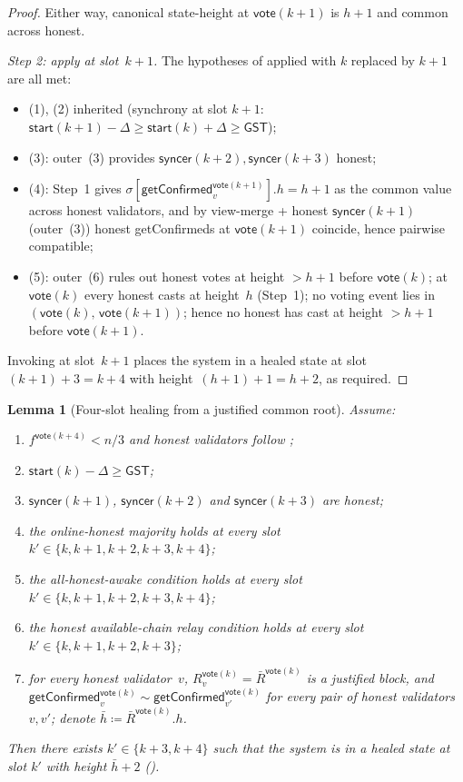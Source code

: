 \ifx\litemode\undefined\documentclass{article}\fi
\newcommand{\syncer}{\mathsf{syncer}}
\newcommand{\start}{\mathsf{start}}
\newcommand{\vote}{\mathsf{vote}}
\newcommand{\comm}[1]{\bar{#1}}
\newcommand{\getConfirmed}{\textsf{getConfirmed}\xspace}
\theoremstyle{plain}
\newtheorem{lemma}{Lemma}
\theoremstyle{definition}
\theoremstyle{remark}
\newcommand{\GST}{\ensuremath{\mathsf{GST}}}
\newcommand{\OHM}{online-honest majority\xspace}
\newcommand{\HAR}{honest available-chain relay\xspace}
\newcommand{\AHA}{all-honest-awake\xspace}
\begin{document}
\begin{proof}
Either way, canonical state-height at $\vote(k+1)$ is $h+1$ and common across honest.

\emph{Step 2: apply  at slot~$k+1$.}
The hypotheses of  applied with $k$ replaced by $k+1$ are all met:
\begin{itemize}
  \item (1), (2) inherited (synchrony at slot $k+1$: $\start(k+1) - \Delta \geq \start(k) + \Delta \geq \GST$);
  \item (3): outer~(3) provides $\syncer(k+2), \syncer(k+3)$ honest;
  \item (4): Step~1 gives $\sigma[\getConfirmed_v^{\vote(k+1)}].h = h + 1$ as the common value across honest validators, and by view-merge + honest $\syncer(k+1)$ (outer~(3)) honest \getConfirmed{}s at $\vote(k+1)$ coincide, hence pairwise compatible;
  \item (5): outer~(6) rules out honest votes at height $>h+1$ before $\vote(k)$; at $\vote(k)$ every honest casts at height~$h$ (Step~1); no voting event lies in $(\vote(k),\, \vote(k+1))$; hence no honest has cast at height $>h+1$ before $\vote(k+1)$.
\end{itemize}
Invoking  at slot~$k+1$ places the system in a healed state at slot~$(k+1)+3 = k+4$ with height~$(h+1)+1 = h+2$, as required.
\end{proof}

\begin{lemma}[Four-slot healing from a justified common root]\label{rev:lem:healing-four-slot-from-justified}
Assume:
\begin{enumerate}
  \item $f^{\vote(k+4)} < n/3$ and honest validators follow ;
  \item $\start(k) - \Delta \geq \GST$;
  \item $\syncer(k+1)$, $\syncer(k+2)$ and $\syncer(k+3)$ are honest;
  \item the \OHM holds at every slot $k' \in \{k, k+1, k+2, k+3, k+4\}$;
  \item the \AHA condition holds at every slot $k' \in \{k, k+1, k+2, k+3, k+4\}$;
  \item the \HAR condition holds at every slot $k' \in \{k, k+1, k+2, k+3\}$;
  \item for every honest validator~$v$, $R_v^{\vote(k)} = \comm{R}^{\vote(k)}$ is a justified block, and $\getConfirmed_v^{\vote(k)} \sim \getConfirmed_{v'}^{\vote(k)}$ for every pair of honest validators~$v, v'$; denote $\comm{h} \coloneqq \comm{R}^{\vote(k)}.h$.
\end{enumerate}
Then there exists $k' \in \{k+3, k+4\}$ such that the system is in a healed state at slot $k'$ with height $\comm{h}+2$ ().
\end{lemma}
\end{document}
